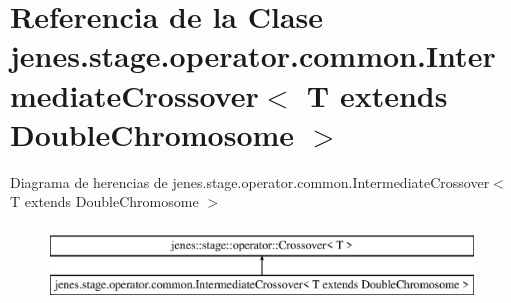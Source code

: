 \hypertarget{classjenes_1_1stage_1_1operator_1_1common_1_1_intermediate_crossover_3_01_t_01extends_01_double_chromosome_01_4}{\section{Referencia de la Clase jenes.\-stage.\-operator.\-common.\-Intermediate\-Crossover$<$ T extends Double\-Chromosome $>$}
\label{classjenes_1_1stage_1_1operator_1_1common_1_1_intermediate_crossover_3_01_t_01extends_01_double_chromosome_01_4}
}
Diagrama de herencias de jenes.\-stage.\-operator.\-common.\-Intermediate\-Crossover$<$ T extends Double\-Chromosome $>$\begin{figure}[H]
\begin{center}
\leavevmode
\includegraphics[height=2.000000cm]{classjenes_1_1stage_1_1operator_1_1common_1_1_intermediate_crossover_3_01_t_01extends_01_double_chromosome_01_4}
\end{center}
\end{figure}
